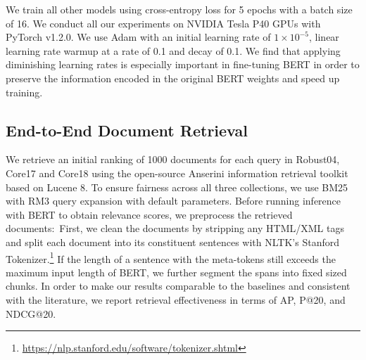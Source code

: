 We train all other models using cross-entropy loss for 5 epochs with a batch size of 16.
We conduct all our experiments on NVIDIA Tesla P40 GPUs with PyTorch v1.2.0.
We use Adam \cite{kingma2014adam} with an initial learning rate of $ 1 \times 10^{-5}$, linear learning rate warmup at a rate of 0.1 and decay of 0.1.
We find that applying diminishing learning rates is especially important in fine-tuning BERT in order to preserve the information encoded in the original BERT weights and speed up training.

\subsection{End-to-End Document Retrieval}

We retrieve an initial ranking of 1000 documents for each query in Robust04, Core17 and Core18 using the open-source Anserini information retrieval toolkit based on Lucene 8.
To ensure fairness across all three collections, we use BM25 with RM3 query expansion with default parameters.
Before running inference with BERT to obtain relevance scores, we preprocess the retrieved documents:\
First, we clean the documents by stripping any HTML/XML tags and split each document into its constituent sentences with NLTK's Stanford Tokenizer.\footnote{\url{https://nlp.stanford.edu/software/tokenizer.shtml}}
If the length of a sentence with the meta-tokens still exceeds the maximum input length of BERT, we further segment the spans into fixed sized chunks.
In order to make our results comparable to the baselines and consistent with the literature, we report retrieval effectiveness in terms of AP, P@20, and NDCG@20.

